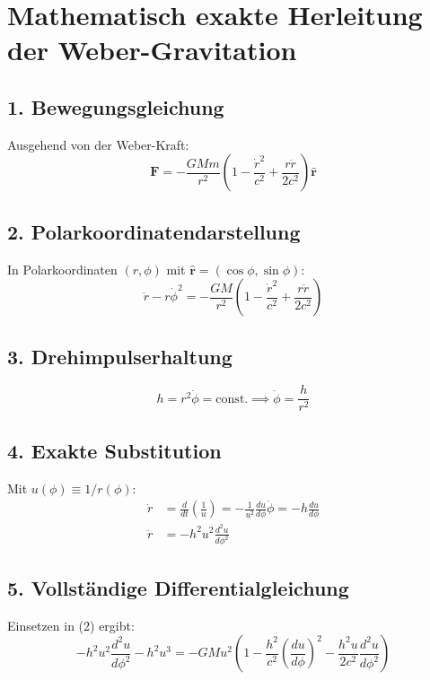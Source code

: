 \section{Mathematisch exakte Herleitung der Weber-Gravitation}

\subsection*{1. Bewegungsgleichung}
Ausgehend von der Weber-Kraft:
\begin{equation}
\bm{F} = -\frac{GMm}{r^2}\left(1 - \frac{\dot{r}^2}{c^2} + \frac{r\ddot{r}}{2c^2}\right)\bm{\hat{r}}
\end{equation}

\subsection*{2. Polarkoordinatendarstellung}
In Polarkoordinaten $(r,\phi)$ mit $\bm{\hat{r}} = (\cos\phi, \sin\phi)$:
\begin{equation}
\ddot{r} - r\dot{\phi}^2 = -\frac{GM}{r^2}\left(1 - \frac{\dot{r}^2}{c^2} + \frac{r\ddot{r}}{2c^2}\right)
\end{equation}

\subsection*{3. Drehimpulserhaltung}
\begin{equation}
h = r^2\dot{\phi} = \text{const.} \implies \dot{\phi} = \frac{h}{r^2}
\end{equation}

\subsection*{4. Exakte Substitution}
Mit $u(\phi) \equiv 1/r(\phi)$:
\begin{align}
\dot{r} &= \frac{d}{dt}\left(\frac{1}{u}\right) = -\frac{1}{u^2}\frac{du}{d\phi}\dot{\phi} = -h\frac{du}{d\phi} \\
\ddot{r} &= -h^2u^2\frac{d^2u}{d\phi^2}
\end{align}

\subsection*{5. Vollständige Differentialgleichung}
Einsetzen in (2) ergibt:
\begin{equation}
-h^2u^2\frac{d^2u}{d\phi^2} - h^2u^3 = -GMu^2\left(1 - \frac{h^2}{c^2}\left(\frac{du}{d\phi}\right)^2 - \frac{h^2u}{2c^2}\frac{d^2u}{d\phi^2}\right)
\end{equation}

